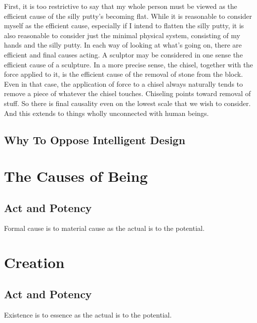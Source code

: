 \documentclass[twocolumn]{article}
\begin{document}
First, it is too restrictive to say that my whole person must be viewed as the
efficient cause of the silly putty's becoming flat.  While it is reasonable to
consider myself as the efficient cause, especially if I intend to flatten the
silly putty, it is also reasonable to consider just the minimal physical
system, consisting of my hands and the silly putty.  In each way of looking at
what's going on, there are efficient and final causes acting.  A sculptor may
be considered in one sense the efficient cause of a sculpture.  In a more
precise sense, the chisel, together with the force applied to it, is the
efficient cause of the removal of stone from the block.  Even in that case, the
application of force to a chisel always naturally tends to remove a piece of
whatever the chisel touches.  Chiseling points toward removal of stuff.  So
there is final causality even on the lowest scale that we wish to consider.
And this extends to things wholly unconnected with human beings.

\subsection{Why To Oppose Intelligent Design}

\section{The Causes of Being}

\subsection{Act and Potency}

Formal cause is to material cause as the actual is to the potential.

\section{Creation}

\subsection{Act and Potency}

Existence is to essence as the actual is to the potential.


\end{document}
